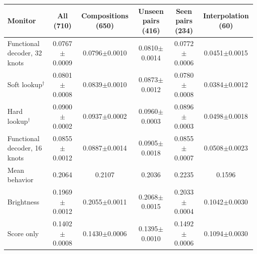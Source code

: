 \setlength{\tabcolsep}{3pt}
\begin{tabular}{lccccc}
\toprule
Monitor & All (710) & Compositions (650) & Unseen pairs (416) & Seen pairs (234) & Interpolation (60) \\
\midrule
Functional decoder, 32 knots & 0.0767$\pm$0.0009 & 0.0796$\pm$0.0010 & 0.0810$\pm$0.0014 & 0.0772$\pm$0.0006 & 0.0451$\pm$0.0015 \\
Soft lookup$^\dagger$ & 0.0801$\pm$0.0008 & 0.0839$\pm$0.0010 & 0.0873$\pm$0.0012 & 0.0780$\pm$0.0008 & 0.0384$\pm$0.0012 \\
Hard lookup$^\dagger$ & 0.0900$\pm$0.0002 & 0.0937$\pm$0.0002 & 0.0960$\pm$0.0003 & 0.0896$\pm$0.0003 & 0.0498$\pm$0.0018 \\
Functional decoder, 16 knots & 0.0855$\pm$0.0012 & 0.0887$\pm$0.0014 & 0.0905$\pm$0.0018 & 0.0855$\pm$0.0007 & 0.0508$\pm$0.0023 \\
Mean behavior & 0.2064 & 0.2107 & 0.2036 & 0.2235 & 0.1596 \\
Brightness & 0.1969$\pm$0.0012 & 0.2055$\pm$0.0011 & 0.2068$\pm$0.0015 & 0.2033$\pm$0.0004 & 0.1042$\pm$0.0030 \\
Score only & 0.1402$\pm$0.0008 & 0.1430$\pm$0.0006 & 0.1395$\pm$0.0010 & 0.1492$\pm$0.0006 & 0.1094$\pm$0.0030 \\
\bottomrule
\end{tabular}
